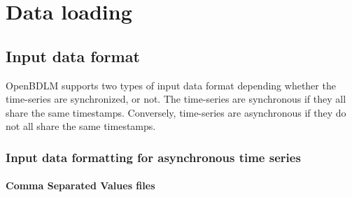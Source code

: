 \documentclass{article}
\begin{document}

\section{Data loading}

\subsection{Input data format}

OpenBDLM supports two types of input data format depending whether the time-series are synchronized, or not.
The time-series are synchronous if they all share the same timestamps. %
Conversely, time-series are asynchronous if they do not all share the same timestamps.


\subsubsection{Input data formatting for asynchronous time series}

\paragraph{Comma Separated Values files}
\label{PAR:CSVasync}
\end{document}
